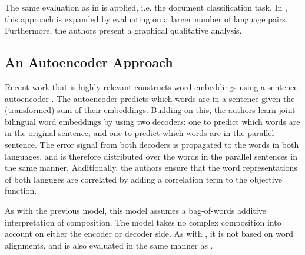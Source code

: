 The same evaluation as in \cite{klementiev2012inducing} is applied, i.e. the document classification task. 
In \cite{hermann2014multilingual}, this approach is expanded by evaluating on a larger number of language pairs. Furthermore, the authors present a graphical qualitative analysis. 

\subsection{An Autoencoder Approach}

Recent work that is highly relevant constructs word embeddings using a sentence autoencoder \cite{SarathChandar2014autoencoder}.
The autoencoder predicts which words are in a sentence given the (transformed) sum of their embeddings.
Building on this, the authors learn joint bilingual word embeddings by using two decoders: one to predict which words are in the original sentence, and one to predict which words are in the parallel sentence.
The error signal from both decoders is propagated to the words in both languages, and is therefore distributed over the words in the parallel sentences in the same manner.
Additionally, the authors ensure that the word representations of both languges are correlated by adding a correlation term to the objective function.

As with the previous model, this model assumes a bag-of-words additive interpretation of composition.
The model takes no complex composition into account on either the encoder or decoder side.
As with \cite{hermann2013multilingual}, it is not based on word alignments, and is also evaluated in the same manner as \cite{klementiev2012inducing}.




